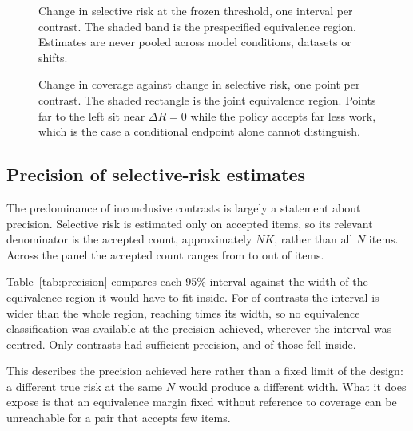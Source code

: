 \documentclass[information,article,submit,moreauthors]{Definitions/mdpi}
\begin{document}


\begin{figure}[H]
\centering

\caption{Change in selective risk at the frozen threshold, one interval per
contrast. The shaded band is the prespecified equivalence region. Estimates are
never pooled across model conditions, datasets or shifts.\label{fig:forest}}
\end{figure}



\begin{figure}[H]
\centering

\caption{Change in coverage against change in selective risk, one point per
contrast. The shaded rectangle is the joint equivalence region. Points far to
the left sit near $\Delta R = 0$ while the policy accepts far less work, which
is the case a conditional endpoint alone cannot
distinguish.\label{fig:endpoints}}
\end{figure}

\subsection{Precision of selective-risk estimates}
\label{sec:precision}

The predominance of inconclusive contrasts is largely a statement about
precision. Selective risk is estimated only on accepted items, so its relevant
denominator is the accepted count, approximately $NK$, rather than all $N$
items. Across the panel the accepted count ranges from \MinAcceptedN{} to
\MaxAcceptedN{} out of \NumHeldOutItems{} items.

Table~\ref{tab:precision} compares each 95\% interval against the width of
the equivalence region it would have to fit inside. For \NumCannotFitBand{} of
\NumContrasts{} contrasts the interval is wider than the whole region,
reaching \MaxWidthRatio{} times its width, so no equivalence classification was
available at the precision achieved, wherever the interval was centred. Only
\NumCanFitBand{} contrasts had sufficient precision, and \NumEquivalent{} of
those fell inside.

This describes the precision achieved here rather than a fixed limit of the design: a
different true risk at the same $N$ would produce a different width. What it
does expose is that an equivalence margin fixed without reference to coverage
can be unreachable for a pair that accepts few items.
\end{document}
